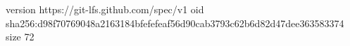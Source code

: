 version https://git-lfs.github.com/spec/v1
oid sha256:d98f70769048a2163184bfefefeaf56d90cab3793c62b6d82d47dee363583374
size 72
